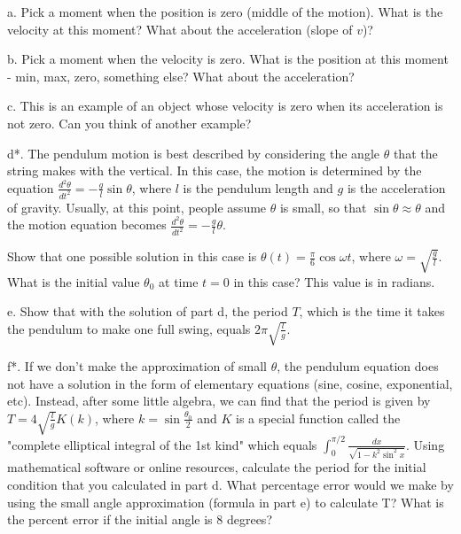 \documentclass[12pt]{article}
\begin{document}
a. Pick a moment when the position is zero (middle of the motion). What is the velocity at this moment? What about the acceleration (slope of $v$)?

b. Pick a moment when the velocity is zero. What is the position at this moment - min, max, zero, something else? What about the acceleration? 

c. This is an example of an object whose velocity is zero when its acceleration is not zero. Can you think of another example?

d*. The pendulum motion is best described by considering the angle $\theta$ that the string makes with the vertical. In this case, the motion is determined by the equation $\frac{d^2\theta}{dt^2}=-\frac{g}{l}\sin\theta$, where $l$ is the pendulum length and $g$ is the acceleration of gravity. Usually, at this point, people assume $\theta$ is small, so that $\sin\theta \approx \theta$ and the motion equation becomes $\frac{d^2\theta}{dt^2}=-\frac{g}{l}\theta$. 

Show that one possible solution in this case is $\theta(t)=\frac{\pi}{6}\cos\omega t$, where $\omega=\sqrt{\frac{g}{l}}$. What is the initial value $\theta_0$ at time $t=0$ in this case? This value is in radians.

e. Show that with the solution of part d, the period $T$, which is the time it takes the pendulum to make one full swing, equals $2\pi\sqrt{\frac{l}{g}}$. 

f*.  If we don't make the approximation of small $\theta$, the pendulum equation does not have a solution in the form of elementary equations (sine, cosine, exponential, etc). Instead, after some little algebra, we can find that the period is given by $T=4\sqrt{\frac{l}{g}}K(k)$, where $k=\sin\frac{\theta_0}{2}$ and $K$ is a special function called the "complete elliptical integral of the 1st kind" which equals $\int_0^{\pi/2}\frac{dx}{\sqrt{1-k^2\sin^2x}}$. Using mathematical software or online resources, calculate the period for the initial condition that you calculated in part d. What percentage error would we make by using the small angle approximation (formula in part e) to calculate T? What is the percent error if the initial angle is 8 degrees?
\end{document}
